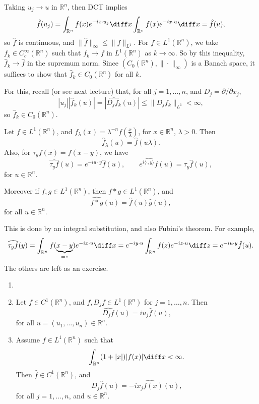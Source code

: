 \documentclass[12pt]{article}
\begin{document}
\begin{proofbox}
	Taking $u_j \to u$ in $\mathbb{R}^n$, then DCT implies
	\[
	\hat f(u_j) = \int_{\mathbb{R}^n}f(x) e^{-i x \cdot u_j} \diff x \int_{\mathbb{R}^n} f(x) e^{-i x \cdot u}\diff x = \hat f(u),
	\]
	so $\hat f$ is continuous, and $\|\hat f\|_{\infty} \leq \|f\|_{L^1}$. For $f \in L^1(\mathbb{R}^n)$, we take $f_k \in C^\infty_c(\mathbb{R}^n)$ such that $f_k \to f$ in $L^1(\mathbb{R}^n)$ as $k \to \infty$. So by this inequality, $\hat f_k \to \hat f$ in the supremum norm. Since $(C_0(\mathbb{R}^n), \|\cdot\|_\infty)$ is a Banach space, it suffices to show that $\hat f_k \in C_0(\mathbb{R}^n)$ for all $k$.

	For this, recall (or see next lecture) that, for all $j = 1, \ldots, n$, and $D_j = \partial/\partial x_j$,
	\[
		|u_j| |\hat f_k(u)| = |\widehat{D_j f_k}(u)| \leq \|D_j f_k\|_{L^1} < \infty,
	\]
	so $\hat f_k \in C_0(\mathbb{R}^n)$.
\end{proofbox}

\begin{lemma}
	Let $f \in L^1(\mathbb{R}^n)$, and $f_\lambda(x) = \lambda^{-n}f(\frac{x}{\lambda})$, for $x \in \mathbb{R}^n$, $\lambda > 0$. Then
	\[
	\hat f_\lambda(u) = \hat f(u\lambda).
	\]
	Also, for $\tau_y f(x) = f(x - y)$, we have
	\[
		\widehat{\tau_y f} (u) = e^{-i u \cdot y}\hat f(u), \qquad \widehat{e^{i \langle \cdot, y \rangle} f} (u) = \tau_y \hat f(u),
	\]
	for $u \in \mathbb{R}^n$.

	Moreover if $f, g \in L^1(\mathbb{R}^n)$, then $f \ast g \in L^1(\mathbb{R}^n)$, and
	\[
		\widehat{f \ast g} (u) = \hat f (u) \hat g(u),
	\]
	for all $u \in \mathbb{R}^n$.
\end{lemma}

\begin{proofbox}
	This is done by an integral substitution, and also Fubini's theorem. For example,
	\[
		\widehat{\tau_y f}(y) = \int_{\mathbb{R}^n} f(\underbrace{x - y}_{=z}) e^{-i x \cdot u}\diff x = e^{-i y \cdot u} \int_{\mathbb{R}^n}f(z) e^{-i z \cdot u}\diff z = e^{-i u \cdot y} \hat f(u).
	\]
	The others are left as an exercise.
\end{proofbox}

\begin{theorem}
	\begin{enumerate}[\normalfont(i)]
		\item[]
		\item Let $f \in C^1(\mathbb{R}^n)$, and $f, D_j f \in L^1(\mathbb{R}^n)$ for $j = 1, \ldots, n$. Then
		\[
			\widehat{D_j f}(u) = i u_j \hat f(u),
		\]
		for all $u = (u_1, \ldots, u_n) \in \mathbb{R}^n$.
		\item Assume $f \in L^1(\mathbb{R}^n)$ such that
			\[
			\int_{\mathbb{R}^n}(1 + |x|) |f(x)| \diff x < \infty.
			\]
			Then $\hat f \in C^1(\mathbb{R}^n)$, and
			\[
				D_j \hat f(u) = -i \widehat{x_j f(x)}(u),
			\]
			for all $j = 1, \ldots, n$, and $u \in \mathbb{R}^n$.
	\end{enumerate}
\end{theorem}
\end{document}
